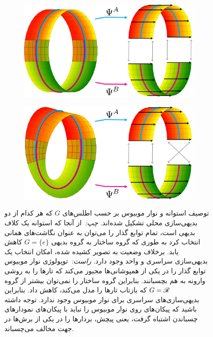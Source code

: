 \begin{figure}
	\centering
	\begin{subfigure}[b]{0.46\textwidth}
		\includegraphics[width=\textwidth]{figures/trivialization_cylinder.png}
	\end{subfigure}
	\hfill
	\begin{subfigure}[b]{0.46\textwidth}
		\centering
		\includegraphics[width=\textwidth]{figures/trivialization_moebius_2.png}
	\end{subfigure}
	\vspace{2.ex}
	\caption{\small
		توصیف استوانه و نوار موبیوس بر حسب اطلس‌های $G$ که هر کدام از دو بدیهی‌سازی محلی تشکیل شده‌اند.
		\textit{چپ:}~از آنجا که استوانه یک کلاف بدیهی است، تمام توابع گذار را می‌توان به عنوان نگاشت‌های همانی انتخاب کرد به طوری که گروه ساختار به گروه بدیهی $G=\{e\}$ کاهش یابد.
		برخلاف وضعیت به تصویر کشیده شده، امکان انتخاب یک بدیهی‌سازی سراسری و واحد وجود دارد.
		\textit{راست:}~توپولوژی نوار موبیوس توابع گذار را در یکی از همپوشانی‌ها مجبور می‌کند که تارها را به روشی وارونه به هم بچسبانند.
		بنابراین گروه ساختار را نمی‌توان بیشتر از گروه $G=\mathscr{R}$ که بازتاب تارها را مدل می‌کند، کاهش داد.
		بنابراین بدیهی‌سازی‌های سراسری برای نوار موبیوس وجود ندارد.
		توجه داشته باشید که پیکان‌های روی نوار موبیوس را نباید با پیکان‌های نمودارهای چسباندن اشتباه گرفت، یعنی پیچش، بردارها را در یکی از برش‌ها در جهت مخالف می‌چسباند.
	}
	\label{fig:trivializations_moebius}
\end{figure}

